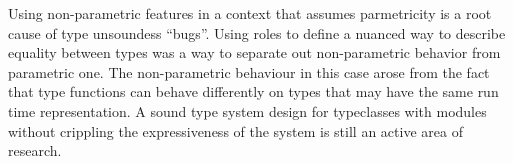 \documentclass[manuscript,screen,nonacm]{acmart}
\begin{document}
Using non-parametric features in a context that assumes parmetricity is a root cause of type unsoundess ``bugs''.
Using roles to define a nuanced way to describe equality between types was a way to separate out non-parametric behavior from parametric one. The non-parametric behaviour in this case arose from the fact that type functions can behave differently on types that may have the same run time representation. 
A sound type system design for typeclasses with modules without crippling the expressiveness of the system is still an active area of research. 


\end{document}
